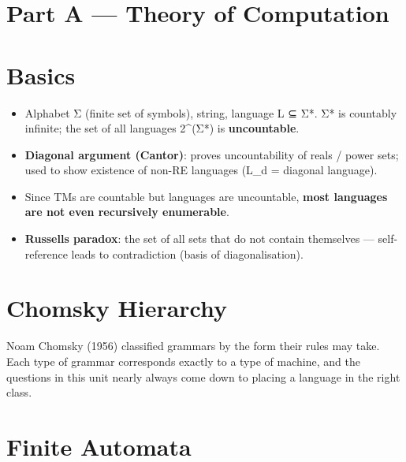 \hypertarget{p2-08--part-a--theory-of-computation}{%
\section{Part A --- Theory of Computation}\label{p2-08--part-a--theory-of-computation}}

\needspace{95pt}

\hypertarget{p2-08--1-basics}{%
\section{Basics}\label{p2-08--1-basics}}

\begin{itemize}
\tightlist
\item
  Alphabet Σ (finite set of symbols), string, language L ⊆ Σ*. \textbar Σ*\textbar{} is countably infinite; the set of all languages 2\^{}(Σ*) is \textbf{uncountable}.
\item
  \textbf{Diagonal argument (Cantor)}: proves uncountability of reals / power sets; used to show existence of non-RE languages (L\_d = diagonal language).
\item
  Since TMs are countable but languages are uncountable, \textbf{most languages are not even recursively enumerable}.
\item
  \textbf{Russell\textquotesingle s paradox}: the set of all sets that do not contain themselves --- self-reference leads to contradiction (basis of diagonalisation).
\end{itemize}

\needspace{125pt}

\hypertarget{p2-08--2-chomsky-hierarchy}{%
\section{Chomsky Hierarchy}\label{p2-08--2-chomsky-hierarchy}}

Noam Chomsky (1956) classified grammars by the form their rules may take. Each type of grammar corresponds
exactly to a type of machine, and the questions in this unit nearly always come down to placing a language
in the right class.





\needspace{161pt}

\hypertarget{p2-08--3-finite-automata}{%
\section{Finite Automata}\label{p2-08--3-finite-automata}}

